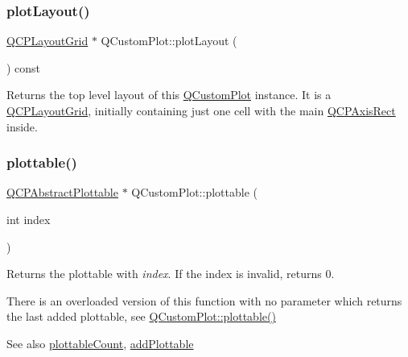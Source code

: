 \subsubsection{\texorpdfstring{plot\+Layout()}{plotLayout()}}
{\footnotesize\ttfamily \mbox{\hyperlink{class_q_c_p_layout_grid}{Q\+C\+P\+Layout\+Grid}} $\ast$ Q\+Custom\+Plot\+::plot\+Layout (\begin{DoxyParamCaption}{ }\end{DoxyParamCaption}) const\hspace{0.3cm}{\ttfamily [inline]}}

Returns the top level layout of this \mbox{\hyperlink{class_q_custom_plot}{Q\+Custom\+Plot}} instance. It is a \mbox{\hyperlink{class_q_c_p_layout_grid}{Q\+C\+P\+Layout\+Grid}}, initially containing just one cell with the main \mbox{\hyperlink{class_q_c_p_axis_rect}{Q\+C\+P\+Axis\+Rect}} inside. \mbox{\label{class_q_custom_plot_a32de81ff53e263e785b83b52ecd99d6f}} 
\subsubsection{\texorpdfstring{plottable()}{plottable()}\hspace{0.1cm}{\footnotesize\ttfamily [1/2]}}
{\footnotesize\ttfamily \mbox{\hyperlink{class_q_c_p_abstract_plottable}{Q\+C\+P\+Abstract\+Plottable}} $\ast$ Q\+Custom\+Plot\+::plottable (\begin{DoxyParamCaption}\item[{int}]{index }\end{DoxyParamCaption})}

Returns the plottable with {\itshape index}. If the index is invalid, returns 0.

There is an overloaded version of this function with no parameter which returns the last added plottable, see \mbox{\hyperlink{class_q_custom_plot_adea38bdc660da9412ba69fb939031567}{Q\+Custom\+Plot\+::plottable()}}

\begin{DoxySeeAlso}{See also}
\mbox{\hyperlink{class_q_custom_plot_a5f4f15991c14bf9ad659bb2a19dfbed4}{plottable\+Count}}, \mbox{\hyperlink{class_q_custom_plot_ab7ad9174f701f9c6f64e378df77927a6}{add\+Plottable}} 
\end{DoxySeeAlso}
\mbox{\label{class_q_custom_plot_adea38bdc660da9412ba69fb939031567}} 
